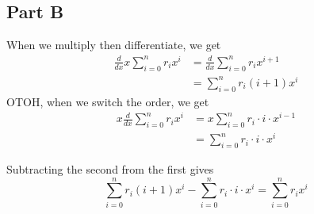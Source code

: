 \documentclass[12pt]{article}
\begin{document}
\subsection{Part B}

When we multiply then differentiate, we get
\begin{align*}
  \frac{d}{dx} x\sum_{i=0}^{n} r_i x^i
  &= \frac{d}{dx} \sum_{i=0}^{n} r_i x^{i+1} \\
  &= \sum_{i=0}^{n} r_i(i+1) x^i
\end{align*}
OTOH, when we switch the order, we get
\begin{align*}
  x\frac{d}{dx} \sum_{i=0}^{n} r_i x^i
  &= x\sum_{i=0}^{n} r_i \cdot i \cdot x^{i-1} \\
  &= \sum_{i=0}^{n} r_i \cdot i \cdot x^i
\end{align*}

Subtracting the second from the first gives
\[\sum_{i=0}^{n} r_i(i+1)x^i - \sum_{i=0}^{n} r_i \cdot i \cdot x^i
=\boxed{\sum_{i=0}^{n} r_i x^i}\]
\end{document}
